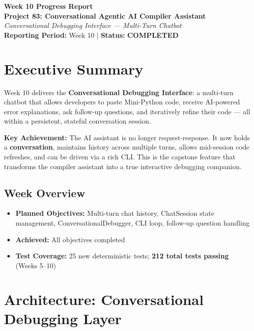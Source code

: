 \documentclass[a4paper,11pt]{article}
\newcommand{\statusgood}[1]{\colorbox{green!20}{\textbf{#1}}}
\begin{document}
\begin{center}
    {\huge \textbf{Week 10 Progress Report}} \\
    \vspace{3mm}
    {\large \textbf{Project 83: Conversational Agentic AI Compiler Assistant}} \\
    \vspace{2mm}
    \textit{Conversational Debugging Interface --- Multi-Turn Chatbot} \\
    \vspace{2mm}
    \textbf{Reporting Period:} Week 10 | \textbf{Status:} \statusgood{COMPLETED}
\end{center}

\vspace{5mm}

\section{Executive Summary}

Week 10 delivers the \textbf{Conversational Debugging Interface}: a multi-turn chatbot that allows developers to paste Mini-Python code, receive AI-powered error explanations, ask follow-up questions, and iteratively refine their code --- all within a persistent, stateful conversation session.

\textbf{Key Achievement:} The AI assistant is no longer request-response. It now holds a \textbf{conversation}, maintains history across multiple turns, allows mid-session code refreshes, and can be driven via a rich CLI. This is the capstone feature that transforms the compiler assistant into a true interactive debugging companion.

\subsection{Week Overview}
\begin{itemize}[leftmargin=*]
    \item \textbf{Planned Objectives:} Multi-turn chat history, ChatSession state management, ConversationalDebugger, CLI loop, follow-up question handling
    \item \textbf{Achieved:} All objectives completed
    \item \textbf{Test Coverage:} 25 new deterministic tests; \textbf{212 total tests passing} (Weeks 5--10)
\end{itemize}

\section{Architecture: Conversational Debugging Layer}
\end{document}
